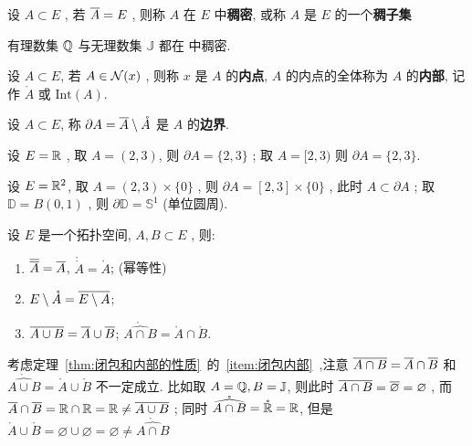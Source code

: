     \begin{Definition}[稠密]\label{def:稠密}
       设 $ A\subset E $ , 若 $ \baro{A}=E $ , 则称 $ A $ 在 $ E $ 中\textbf{稠密}, 或称 $ A $ 是 $ E $ 的一个\textbf{稠子集}
    \end{Definition}
    \begin{Example}
       有理数集 $ \Q $ 与无理数集 $ \mathbb{J} $ 都在 \R 中稠密.
    \end{Example}
    \begin{Definition}[内部]\label{def:内部}
       设 $ A\subset E $, 若 $ A\in\CN(x) $ , 则称 $ x $ 是 $ A $ 的\textbf{内点},  $ A $ 的内点的全体称为 $ A $ 的\textbf{内部}, 记作 $ \mathring{A} $ 或 $ \mathrm{Int}(A) $.
    \end{Definition}
    \begin{Definition}[边界]\label{def:边界}
       设 $ A\subset E $, 称 $ \partial A = \baro{A}\sm\mathring{A} $ 是 $ A $ 的\textbf{边界}.
    \end{Definition}
    \begin{Example}
       设 $ E=\R $ , 取 $ A = (2, 3) $, 则 $ \partial A = \{ 2, 3 \} $ ; 取 $ A = [2, 3) $ 则 $ \partial A = \{ 2, 3 \} $.

       设 $ E = \R^{2} $, 取 $ A = (2, 3)\times \{0\} $ , 则 $ \partial A = [2, 3]\times \{0\} $ , 此时 $ A\subset \partial A $  ; 取 $ \mathbb{D}=B(0, 1) $ , 则 $ \partial \mathbb{D}=\mathbb{S}^{1} $ (单位圆周).
    \end{Example}
    \begin{Theorem}\label{thm:闭包和内部的性质}
       设 $ E $ 是一个拓扑空间, $ A, B\subset E $ , 则:
       \begin{enumerate}[(1)]
          \item $ \baro{\baro{A}}=\baro{A} $, $ \mathring{\mathring{A}}=\mathring{A} $; (幂等性)
          \item $ E\sm\mathring{A}=\overline{E\sm A} $;
          \item \label{item:闭包内部}$ \overline {A\cup B}=\baro{A}\cup \baro{B} $; $ \mathring{\widehat{A\cap B}}=\mathring{A}\cap\mathring{B} $.
        \end{enumerate}
    \end{Theorem}
    \begin{Remark}
       考虑定理~\ref{thm:闭包和内部的性质}~的~\ref{item:闭包内部}~,注意 $ \overline {A\cap B}=\baro{A}\cap \baro{B} $ 和 $ \mathring{\widehat{A\cup B}}=\mathring{A}\cup\mathring{B} $ 不一定成立. 比如取 $ A=\Q, B=\mathbb{J} $, 则此时 $ \overline{A\cap B}=\baro{\varnothing}=\varnothing $  , 而 $ \baro{A}\cap \baro{B}=\R\cap\R=\R\neq\overline {A\cup B} $ ; 同时 $ \mathring{\widehat{A\cap B}}=\mathring{\R}=\R $, 但是 $ \mathring{A}\cup\mathring{B}=\varnothing\cup\varnothing=\varnothing\neq \mathring{\widehat{A\cap B}} $
    \end{Remark}
